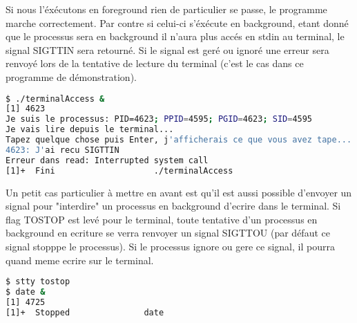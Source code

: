 Si nous l'éxécutons en foreground rien de particulier se passe, le programme marche correctement. Par contre si celui-ci s'éxécute en background, etant donné que
le processus sera en background il n'aura plus accés en stdin au terminal, le signal SIGTTIN sera retourné.
Si le signal est geré ou ignoré une erreur sera renvoyé lors de la tentative de lecture du terminal (c'est le cas dans ce programme de démonstration).

\begin{lstlisting}[language=bash]
$ ./terminalAccess &
[1] 4623
Je suis le processus: PID=4623; PPID=4595; PGID=4623; SID=4595
Je vais lire depuis le terminal...
Tapez quelque chose puis Enter, j'afficherais ce que vous avez tape...
4623: J'ai recu SIGTTIN
Erreur dans read: Interrupted system call
[1]+  Fini                    ./terminalAccess
\end{lstlisting}

Un petit cas particulier à mettre en avant est qu'il est aussi possible d'envoyer un signal pour "interdire" un processus en background d'ecrire dans le terminal. Si flag TOSTOP est levé pour
le terminal, toute tentative d'un processus en background en ecriture se verra renvoyer un signal SIGTTOU (par défaut ce signal stopppe le processus). Si le processus ignore ou gere ce signal,
il pourra quand meme ecrire sur le terminal.

\begin{lstlisting}[language=bash]
$ stty tostop
$ date &
[1] 4725
[1]+  Stopped               date
\end{lstlisting}
